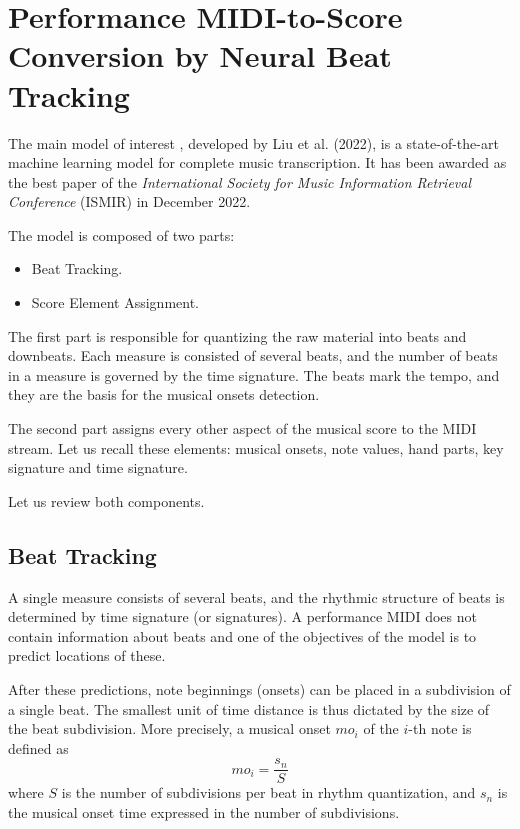 \chapter{Performance MIDI-to-Score Conversion by Neural Beat Tracking}\label{performance_midi_to_score_conversion_by_neural_beat_tracking}

The main model of interest \cite{Liu2022}, developed by Liu et al. (2022), is a state-of-the-art machine learning model for complete music transcription. It has been awarded as the best paper of the \emph{International Society for Music Information Retrieval Conference} (ISMIR) in December 2022.

The model is composed of two parts:
\begin{itemize}
	\item Beat Tracking.
	\item Score Element Assignment.
\end{itemize}

The first part is responsible for quantizing the raw material into beats and downbeats. Each measure is consisted of several beats, and the number of beats in a measure is governed by the time signature. The beats mark the tempo, and they are the basis for the musical onsets detection.

The second part assigns every other aspect of the musical score to the MIDI stream. Let us recall these elements: musical onsets, note values, hand parts, key signature and time signature.

Let us review both components.

\section{Beat Tracking}

A single measure consists of several beats, and the rhythmic structure of beats is determined by time signature (or signatures). A performance MIDI does not contain information about beats and one of the objectives of the model is to predict locations of these.

After these predictions, note beginnings (onsets) can be placed in a subdivision of a single beat. The smallest unit of time distance is thus dictated by the size of the beat subdivision. More precisely, a musical onset $mo_i$ of the $i$-th note is defined as \[mo_i = \frac{s_n}{S}\] where $S$ is the number of subdivisions per beat in rhythm quantization, and $s_n$ is the musical onset time expressed in the number of subdivisions.


